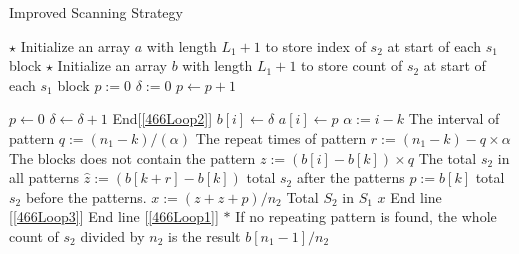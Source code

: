 \begin{algorithm}[H]
\caption{Improved Scanning Strategy}
\begin{algorithmic}[1]
\State $\star$ Initialize an array $a$ with length $L_1+1$ to store index of $s_2$ at start of each $s_1$ block
\State $\star$ Initialize an array $b$ with length $L_1+1$ to store count of $s_2$ at start of each $s_1$ block
\State $p := 0$
\State $\delta := 0$
 \label{466Loop1}
 \label{466Loop2}
\State $p\gets p+1$
\EndIf
{}
\end{algorithmic}
\end{algorithm}
\begin{algorithm}[H]
\begin{algorithmic}[1]
\State $p \gets 0$
\State $\delta \gets \delta + 1$
\EndIf
\EndFor \Comment End[\ref{466Loop2}]
\State $b[i] \gets \delta$
\State $a[i] \gets p$
 \label{466Loop3}
\State $\alpha := i - k$ \Comment The interval of pattern
\State $q := (n_1-k)/(\alpha)$ \Comment The repeat times of pattern
\State $r := (n_1-k) - q \times \alpha$ \Comment The blocks does not contain the pattern
\State $z := (b[i]-b[k])\times q$ \Comment The total $s_2$ in all patterns
\State $\hat{z}:=(b[k+r] - b[k])$ \Comment total $s_2$ after the patterns
\State $p:=b[k]$ \Comment total $s_2$ before the patterns.
\State $x:=(z+\hat{z}+p) / n_2$ \Comment Total $S_2$ in $S_1$
\State \Return $x$
\EndIf
\EndFor \Comment End line [\ref{466Loop3}]
\EndFor \Comment End line [\ref{466Loop1}]
\State $\ast$ If no repeating pattern is found, the whole count of $s_2$ divided by $n_2$ is the result
\State \Return $b[n_1-1]/n_2$
\EndProcedure
\end{algorithmic}
\end{algorithm}

